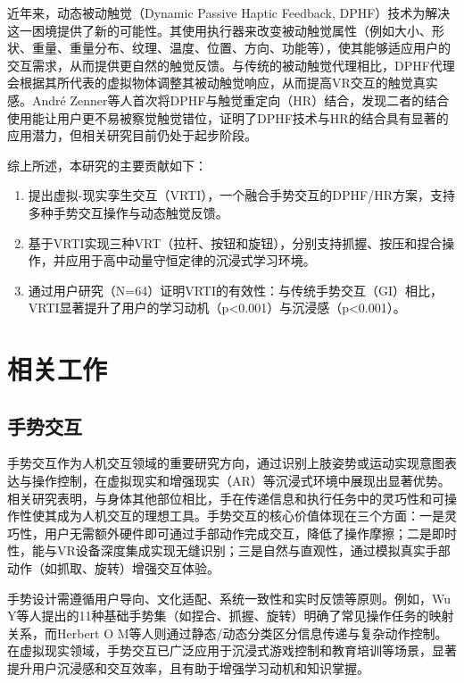 \documentclass[runningheads]{llncs}
\begin{document}
近年来，动态被动触觉（Dynamic Passive Haptic Feedback, DPHF）技术为解决这一困境提供了新的可能性\cite{zenner2017shifty}。其使用执行器来改变被动触觉属性（例如大小、形状、重量、重量分布、纹理、温度、位置、方向、功能等），使其能够适应用户的交互需求，从而提供更自然的触觉反馈。与传统的被动触觉代理相比，DPHF代理会根据其所代表的虚拟物体调整其被动触觉响应，从而提高VR交互的触觉真实感。André Zenner等人首次将DPHF与触觉重定向（HR）结合，发现二者的结合使用能让用户更不易被察觉触觉错位，证明了DPHF技术与HR的结合具有显著的应用潜力\cite{zenner2021combining}，但相关研究目前仍处于起步阶段。

综上所述，本研究的主要贡献如下：

\begin{enumerate}[label={\arabic*)}]
  \item 提出虚拟-现实孪生交互（VRTI），一个融合手势交互的DPHF/HR方案，支持多种手势交互操作与动态触觉反馈。
  \item 基于VRTI实现三种VRT（拉杆、按钮和旋钮），分别支持抓握、按压和捏合操作，并应用于高中动量守恒定律的沉浸式学习环境。
  \item 通过用户研究（N=64）证明VRTI的有效性：与传统手势交互（GI）相比，VRTI显著提升了用户的学习动机（p<0.001）与沉浸感（p<0.001）。
\end{enumerate}

\section{相关工作}
\subsection{手势交互} 
手势交互作为人机交互领域的重要研究方向，通过识别上肢姿势或运动实现意图表达与操作控制\cite{yang2019gesture}，在虚拟现实和增强现实（AR）等沉浸式环境中展现出显著优势\cite{10574578}。相关研究表明，与身体其他部位相比，手在传递信息和执行任务中的灵巧性和可操作性使其成为人机交互的理想工具\cite{karam2006framework}。手势交互的核心价值体现在三个方面\cite{mitra2007gesture,10580881,app14114935}：一是灵巧性，用户无需额外硬件即可通过手部动作完成交互，降低了操作摩擦；二是即时性，能与VR设备深度集成实现无缝识别；三是自然与直观性，通过模拟真实手部动作（如抓取、旋转）增强交互体验。

手势设计需遵循用户导向、文化适配、系统一致性和实时反馈等原则\cite{lou2018analysis}。例如，Wu Y等人提出的11种基础手势集（如捏合、抓握、旋转）明确了常见操作任务的映射关系\cite{wu2024empirical}，而Herbert O M等人则通过静态/动态分类区分信息传递与复杂动作控制\cite{herbert2024static}。在虚拟现实领域，手势交互已广泛应用于沉浸式游戏控制和教育培训等场景\cite{10574578,lu2024chemical}，显著提升用户沉浸感和交互效率\cite{10580881}，且有助于增强学习动机和知识掌握\cite{lu2024chemical}。
\end{document}
